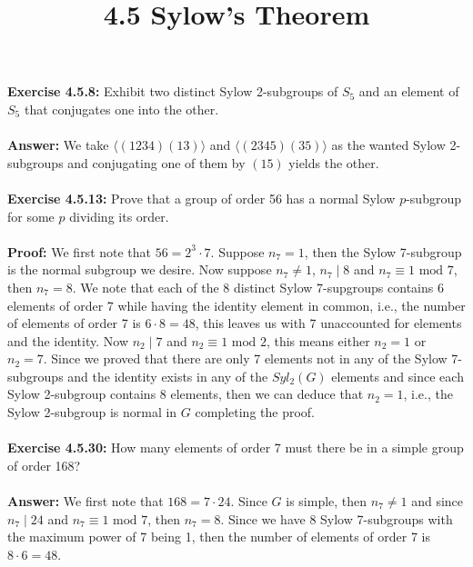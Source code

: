 \documentclass{article}
\title{\textbf{4.5 Sylow's Theorem}}
\begin{document}
	\maketitle
	\textbf{Exercise 4.5.8:} Exhibit two distinct Sylow 2-subgroups of $S_5$ and an element of $S_5$ that conjugates one into the other. \\ \\
	\textbf{Answer:} We take $\langle(1234)(13)\rangle$ and $\langle(2345)(35)\rangle$ as the wanted Sylow 2-subgroups and conjugating one of them by $(15)$ yields the other. \\ \\
	\textbf{Exercise 4.5.13:} Prove that a group of order 56 has a normal Sylow $p$-subgroup for some $p$ dividing its order. \\ \\
	\textbf{Proof:} We first note that $56 = 2^3 \cdot 7$. Suppose $n_7 = 1$, then the Sylow 7-subgroup is the normal subgroup we desire. Now suppose $n_7 \neq 1$, $n_7 \;|\; 8$ and $n_7 \equiv 1 \text{ mod } 7$, then $n_7 = 8$. We note that each of the 8 distinct Sylow 7-supgroups contains 6 elements of order 7 while having the identity element in common, i.e., the number of elements of order 7 is $6 \cdot 8 = 48$, this leaves us with 7 unaccounted for elements and the identity. Now $n_2 \;|\; 7$ and $n_2 \equiv 1 \text{ mod } 2$, this means either $n_2 = 1$ or $n_2 = 7$. Since we proved that there are only 7 elements not in any of the Sylow 7-subgroups and the identity exists in any of the $Syl_2(G)$ elements and since each Sylow 2-subgroup contains 8 elements, then we can deduce that $n_2 = 1$, i.e., the Sylow 2-subgroup is normal in $G$ completing the proof. \\ \\
	\textbf{Exercise 4.5.30:} How many elements of order 7 must there be in a simple group of order 168? \\ \\
	\textbf{Answer:} We first note that $168 = 7 \cdot 24$. Since $G$ is simple, then $n_7 \neq 1$ and since $n_7 \;|\; 24$ and $n_7 \equiv 1 \text{ mod } 7$, then $n_7 = 8$. Since we have 8 Sylow 7-subgroups with the maximum power of 7 being 1, then the number of elements of order 7 is $8 \cdot 6 = 48$.
\end{document}
